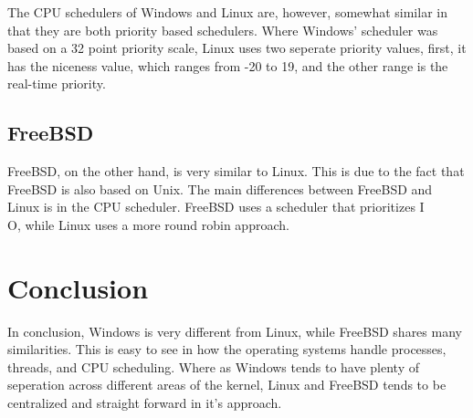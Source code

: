 \documentclass[journal,letterpaper,draftclsnofoot,onecolumn,10pt]{IEEEtran}
\begin{document}
The CPU schedulers of Windows and Linux are, however, somewhat similar in that they are both priority based schedulers. Where Windows' scheduler was based on a 32 point priority scale, Linux uses two seperate priority values, first, it has the niceness value, which ranges from -20 to 19, and the other range is the real-time priority.\cite{l05}

\subsection{FreeBSD}
FreeBSD, on the other hand, is very similar to Linux. This is due to the fact that FreeBSD is also based on Unix. The main differences between FreeBSD and Linux is in the CPU scheduler. FreeBSD uses a scheduler that prioritizes I\\O, while Linux uses a more round robin approach.

\section{Conclusion}
In conclusion, Windows is very different from Linux, while FreeBSD shares many similarities. This is easy to see in how the operating systems handle processes, threads, and CPU scheduling. Where as Windows tends to have plenty of seperation across different areas of the kernel, Linux and FreeBSD tends to be centralized and straight forward in it's approach.

\vfill

\pagebreak




\end{document}
